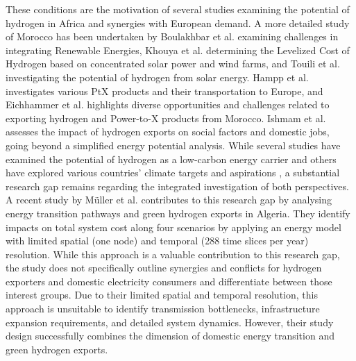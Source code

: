 \documentclass[5p,numafflabel]{elsarticle}
\begin{document}
These conditions are the motivation of several studies \cite{vanWijk2021, AbouSeada2022, vanderZwaan2021, Schellekens2010, Cavana2021, Touili2022, Timmerberg2019, Sens2022, Franzmann2023} examining the potential of hydrogen in Africa and synergies with European demand. A more detailed study of Morocco has been undertaken by Boulakhbar et al.\cite{Boulakhbar2020} examining challenges in integrating Renewable Energies, Khouya et al.\cite{Khouya2020} determining the Levelized Cost of Hydrogen based on concentrated solar power and wind farms, and Touili et al.\cite{Touili2018} investigating the potential of hydrogen from solar energy. Hampp et al.\cite{Hampp2023} investigates various PtX products and their transportation to Europe, and Eichhammer et al. \cite{Eichhammer2019} highlights diverse opportunities and challenges related to exporting hydrogen and Power-to-X products from Morocco. Ishmam et al. \cite{Ishmam2024} assesses the impact of hydrogen exports on social factors and domestic jobs, going beyond a simplified energy potential analysis.
While several studies \cite{Hampp2023, AbouSeada2022, vanWijk2021} have examined the potential of hydrogen as a low-carbon energy carrier and others have explored various countries' climate targets and aspirations \cite{Boulakhbar2020}, a substantial research gap remains regarding the integrated investigation of both perspectives. 
A recent study by Müller et al.\cite{Muller2024} contributes to this research gap by analysing energy transition pathways and green hydrogen exports in Algeria. They identify impacts on total system cost along four scenarios by applying an energy model with limited spatial (one node) and temporal (288 time slices per year) resolution. While this approach is a valuable contribution to this research gap, the study does not specifically outline synergies and conflicts for hydrogen exporters and domestic electricity consumers and differentiate between those interest groups. 
Due to their limited spatial and temporal resolution, this approach is unsuitable to identify transmission bottlenecks, infrastructure expansion requirements, and detailed system dynamics. However, their study design successfully combines the dimension of domestic energy transition and green hydrogen exports.
\end{document}
